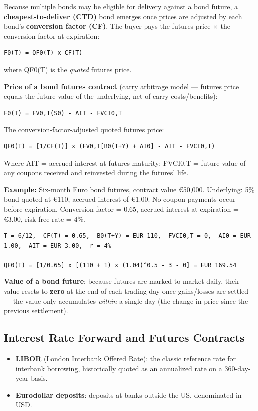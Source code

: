 \documentclass[12pt,openany]{book}
\theoremstyle{definition}
\theoremstyle{remark}
\begin{document}
Because multiple bonds may be eligible for delivery against a bond future, a \textbf{cheapest-to-deliver (CTD)} bond emerges once prices are adjusted by each bond's \textbf{conversion factor (CF)}. The buyer pays the futures price × the conversion factor at expiration:
\begin{lstlisting}[style=notesCode]
F0(T) = QF0(T) x CF(T)
\end{lstlisting}
where QF0(T) is the \emph{quoted} futures price.

\textbf{Price of a bond futures contract} (carry arbitrage model — futures price equals the future value of the underlying, net of carry costs/benefits):
\begin{lstlisting}[style=notesCode]
F0(T) = FV0,T(S0) - AIT - FVCI0,T
\end{lstlisting}
The conversion-factor-adjusted quoted futures price:
\begin{lstlisting}[style=notesCode]
QF0(T) = [1/CF(T)] x (FV0,T[B0(T+Y) + AI0] - AIT - FVCI0,T)
\end{lstlisting}
Where AIT = accrued interest at futures maturity; FVCI0,T = future value of any coupons received and reinvested during the futures' life.

\textbf{Example:} Six-month Euro bond futures, contract value €50,000. Underlying: 5\% bond quoted at €110, accrued interest of €1.00. No coupon payments occur before expiration. Conversion factor = 0.65, accrued interest at expiration = €3.00, risk-free rate = 4\%.
\begin{lstlisting}[style=notesCode]
T = 6/12,  CF(T) = 0.65,  B0(T+Y) = EUR 110,  FVCI0,T = 0,  AI0 = EUR 1.00,  AIT = EUR 3.00,  r = 4%

QF0(T) = [1/0.65] x [(110 + 1) x (1.04)^0.5 - 3 - 0] = EUR 169.54
\end{lstlisting}

\textbf{Value of a bond future}: because futures are marked to market daily, their value resets to \textbf{zero} at the end of each trading day once gains/losses are settled — the value only accumulates \emph{within} a single day (the change in price since the previous settlement).

\subsection{Interest Rate Forward and Futures Contracts}

\begin{itemize}
\item \textbf{LIBOR} (London Interbank Offered Rate): the classic reference rate for interbank borrowing, historically quoted as an annualized rate on a 360-day-year basis.
\item \textbf{Eurodollar deposits}: deposits at banks outside the US, denominated in USD.
\end{itemize}
\end{document}
